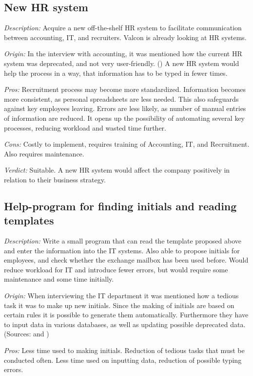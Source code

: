 \subsection{New HR system}
\emph{Description:} Acquire a new off-the-shelf HR system to facilitate communication between accounting, IT, and recruiters.
Valcon is already looking at HR systems.

\emph{Origin:}
In the interview with accounting, it was mentioned how the current HR system was deprecated, and not very user-friendly.
()
A new HR system would help the process in a way, that information has to be typed in fewer times.

\noindent \emph{Pros:} Recruitment process may become more standardized.
Information becomes more consistent, as personal spreadsheets are less needed. 
This also safeguards against key employees leaving.
Errors are less likely, as number of manual entries of information are reduced.
It opens up the possibility of automating several key processes, reducing workload and wasted time further.

\noindent \emph{Cons:} Costly to implement, requires training of Accounting, IT, and Recruitment.
Also requires maintenance.

\emph{Verdict:}
Suitable. A new HR system would affect the company positively in relation to their business strategy.

\subsection{Help-program for finding initials and reading templates}
\emph{Description:} 
Write a small program that can read the template proposed above and enter the information into the IT systems.
Also able to propose initials for employees, and check whether the exchange mailbox has been used before.
Would reduce workload for IT and introduce fewer errors, but would require some maintenance and some time initially.

\emph{Origin:}
When interviewing the IT department it was mentioned how a tedious task it was to make up new initials. Since the making of initials are based on certain rules it is possible to generate them automatically. Furthermore they have to input data in various databases, as well as updating possible deprecated data.
(Sources:  and )

\noindent \emph{Pros:} 
Less time used to making initials. Reduction of tedious tasks that must be conducted often.
Less time used on inputting data, reduction of possible typing errors.

